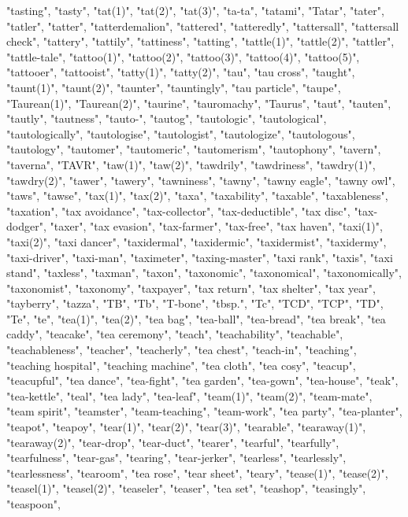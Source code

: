 "tasting",
"tasty",
"tat(1)",
"tat(2)",
"tat(3)",
"ta-ta",
"tatami",
"Tatar",
"tater",
"tatler",
"tatter",
"tatterdemalion",
"tattered",
"tatteredly",
"tattersall",
"tattersall check",
"tattery",
"tattily",
"tattiness",
"tatting",
"tattle(1)",
"tattle(2)",
"tattler",
"tattle-tale",
"tattoo(1)",
"tattoo(2)",
"tattoo(3)",
"tattoo(4)",
"tattoo(5)",
"tattooer",
"tattooist",
"tatty(1)",
"tatty(2)",
"tau",
"tau cross",
"taught",
"taunt(1)",
"taunt(2)",
"taunter",
"tauntingly",
"tau particle",
"taupe",
"Taurean(1)",
"Taurean(2)",
"taurine",
"tauromachy",
"Taurus",
"taut",
"tauten",
"tautly",
"tautness",
"tauto-",
"tautog",
"tautologic",
"tautological",
"tautologically",
"tautologise",
"tautologist",
"tautologize",
"tautologous",
"tautology",
"tautomer",
"tautomeric",
"tautomerism",
"tautophony",
"tavern",
"taverna",
"TAVR",
"taw(1)",
"taw(2)",
"tawdrily",
"tawdriness",
"tawdry(1)",
"tawdry(2)",
"tawer",
"tawery",
"tawniness",
"tawny",
"tawny eagle",
"tawny owl",
"taws",
"tawse",
"tax(1)",
"tax(2)",
"taxa",
"taxability",
"taxable",
"taxableness",
"taxation",
"tax avoidance",
"tax-collector",
"tax-deductible",
"tax disc",
"tax-dodger",
"taxer",
"tax evasion",
"tax-farmer",
"tax-free",
"tax haven",
"taxi(1)",
"taxi(2)",
"taxi dancer",
"taxidermal",
"taxidermic",
"taxidermist",
"taxidermy",
"taxi-driver",
"taxi-man",
"taximeter",
"taxing-master",
"taxi rank",
"taxis",
"taxi stand",
"taxless",
"taxman",
"taxon",
"taxonomic",
"taxonomical",
"taxonomically",
"taxonomist",
"taxonomy",
"taxpayer",
"tax return",
"tax shelter",
"tax year",
"tayberry",
"tazza",
"TB",
"Tb",
"T-bone",
"tbsp.",
"Tc",
"TCD",
"TCP",
"TD",
"Te",
"te",
"tea(1)",
"tea(2)",
"tea bag",
"tea-ball",
"tea-bread",
"tea break",
"tea caddy",
"teacake",
"tea ceremony",
"teach",
"teachability",
"teachable",
"teachableness",
"teacher",
"teacherly",
"tea chest",
"teach-in",
"teaching",
"teaching hospital",
"teaching machine",
"tea cloth",
"tea cosy",
"teacup",
"teacupful",
"tea dance",
"tea-fight",
"tea garden",
"tea-gown",
"tea-house",
"teak",
"tea-kettle",
"teal",
"tea lady",
"tea-leaf",
"team(1)",
"team(2)",
"team-mate",
"team spirit",
"teamster",
"team-teaching",
"team-work",
"tea party",
"tea-planter",
"teapot",
"teapoy",
"tear(1)",
"tear(2)",
"tear(3)",
"tearable",
"tearaway(1)",
"tearaway(2)",
"tear-drop",
"tear-duct",
"tearer",
"tearful",
"tearfully",
"tearfulness",
"tear-gas",
"tearing",
"tear-jerker",
"tearless",
"tearlessly",
"tearlessness",
"tearoom",
"tea rose",
"tear sheet",
"teary",
"tease(1)",
"tease(2)",
"teasel(1)",
"teasel(2)",
"teaseler",
"teaser",
"tea set",
"teashop",
"teasingly",
"teaspoon",
